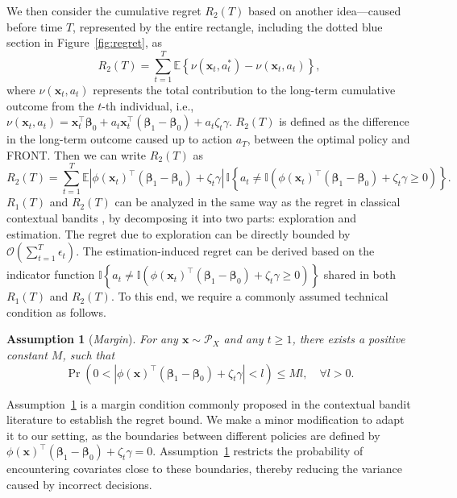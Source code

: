 \documentclass[12pt]{article}
\newtheorem{assumption}{Assumption}[section]
\begin{document}
We then consider the cumulative regret $R_2(T)$ based on another idea—caused before time $T$, represented by the entire rectangle, including the dotted blue section in Figure~\ref{fig:regret}, as
\begin{equation}
\label{equ:regret2}
    R_2(T) = \sum_{t=1}^T \mathbb{E} \left\{\nu(\bm{x}_t, a_t^{\ast}) - \nu(\bm{x}_t,a_t) \right\},
\end{equation}
where \( \nu(\bm{x}_t, a_t) \) represents the total contribution to the long-term cumulative outcome from the \( t \)-th individual, i.e.,
$\nu(\bm{x}_t,a_t) = \bm{x}_t^{\top}\bm{\beta}_0 + a_t\bm{x}_t^{\top}(\bm{\beta}_1-\bm{\beta}_0)+ a_t \zeta_t \gamma.$ 
$R_2(T)$ is defined as the difference in the long-term outcome caused up to action $a_T$, between the optimal policy and FRONT. Then we can write $R_2(T)$ as
\begin{equation*}
    R_2(T) = \sum_{t=1}^{T} \mathbb{E} \left|\phi(\bm{x}_t)^{\top} (\bm{\beta}_1 - \bm{\beta}_0) + \zeta_t \gamma \right| \, \mathbb{I} \left\{ a_t \neq \mathbb{I} \left(\phi(\bm{x}_t)^{\top} (\bm{\beta}_1 - \bm{\beta}_0) + \zeta_t \gamma \ge 0 \right) \right\}.
\end{equation*}
 $R_1(T)$ and $R_2(T)$ can be analyzed in the same way as the regret in classical contextual bandits \citep{chen2021}, by decomposing it into two parts: exploration and estimation. The regret due to exploration can be directly bounded by $\mathcal{O}(\sum_{t=1}^T \epsilon_t)$. The estimation-induced regret can be derived based on the indicator function $\mathbb{I} \left\{ a_t \neq \mathbb{I} \left(\phi(\bm{x}_t)^{\top} (\bm{\beta}_1 - \bm{\beta}_0) + \zeta_t \gamma \ge 0\right) \right\}$ shared in both $R_1(T)$ and $R_2(T)$. To this end, we require a commonly assumed technical condition as follows.


\begin{assumption}[{\emph{Margin}}]
\label{ass:margin}
    For any $\bm{x} \sim \mathcal{P}_X$ and any $t \ge 1$, there exists a positive constant $M$, such that
\begin{equation*}
\Pr\left(0<\left|\phi(\bm{x})^{\top} (\bm{\beta}_1 - \bm{\beta}_0) + \zeta_t \gamma \right| < l\right) \le Ml, \quad \forall l>0.
\end{equation*}
\end{assumption}

Assumption~\ref{ass:margin} is a margin condition commonly proposed in the contextual bandit literature \citep{goldenshluger2013,chambaz2017,bastani2020,chen2021,shen2024,xu2024} to establish the regret bound. We make a minor modification to adapt it to our setting, as the boundaries between different policies are defined by $\phi(\bm{x})^{\top} (\bm{\beta}_1 - \bm{\beta}_0) + \zeta_t \gamma = 0$. Assumption~\ref{ass:margin} restricts the probability of encountering covariates close to these boundaries, thereby reducing the variance caused by incorrect decisions.  
\end{document}
